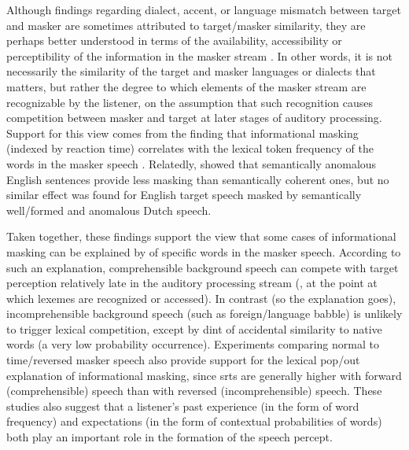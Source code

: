 Although findings regarding dialect, accent, or language mismatch between target and masker are sometimes attributed to target\-/masker similarity, they are perhaps better understood in terms of the availability, accessibility or perceptibility of the information in the masker stream \citep{VanEngenBradlow2007, CalandruccioEtAl2010, BrouwerEtAl2012}.  In other words, it is not necessarily the similarity of the target and masker languages or dialects that matters, but rather the degree to which elements of the masker stream are recognizable by the listener, on the assumption that such recognition causes competition between masker and target at later stages of auditory processing.  Support for this view comes from the finding that informational masking (indexed by reaction time) correlates with the lexical token frequency of the words in the masker speech \citep{BoulengerEtAl2010}.  Relatedly, \citet{BrouwerEtAl2012} showed that semantically anomalous English sentences provide less masking than semantically coherent ones, but no similar effect was found for English target speech masked by semantically well\-/formed and anomalous Dutch speech.  

Taken together, these findings support the view that some cases of informational masking can be explained by  of specific words in the masker speech.  According to such an explanation, comprehensible background speech can compete with target perception relatively late in the auditory processing stream (\ie, at the point at which lexemes are recognized or accessed).  In contrast (so the explanation goes), incomprehensible background speech (such as foreign\-/language babble) is unlikely to trigger lexical competition, except by dint of accidental similarity to native words (a very low probability occurrence).  Experiments comparing normal to time\-/reversed masker speech also provide support for the lexical pop\-/out explanation of informational masking, since \ac{srt}s are generally higher with forward (comprehensible) speech than with reversed (incomprehensible) speech.\footnotemark{}  These studies also suggest that a listener’s past experience (in the form of word frequency) and expectations (in the form of contextual probabilities of words) both play an important role in the formation of the speech percept.


